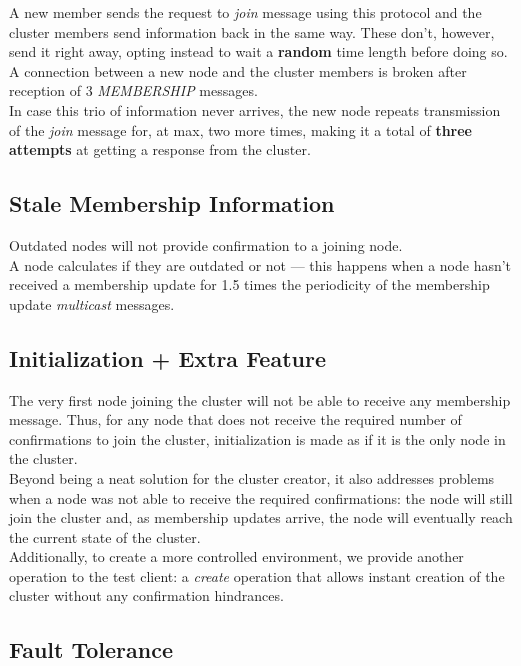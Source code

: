 \documentclass{article}
\begin{document}
\begin{multicols}{2}
	A new member sends the request to \textit{join} message using this protocol and the cluster members send information back in the same way. These don’t, however, send it right away, opting instead to wait a \textbf{random} time length before doing so.\\
	
	A connection between a new node and the cluster members is broken after reception of 3 \textit{MEMBERSHIP} messages.\\
	
	In case this trio of information never arrives, the new node repeats transmission of the \textit{join} message for, at max, two more times, making it a total of \textbf{three attempts} at getting a response from the cluster.
	
	\subsection{Stale Membership Information}
	Outdated nodes will not provide confirmation to a joining node.\\
	
	A node calculates if they are outdated or not --- this happens when a node hasn't received a membership update for 1.5 times the periodicity of the membership update \textit{multicast} messages.

    \subsection{Initialization + Extra Feature}
    The very first node joining the cluster will not be able to receive any membership message. Thus, for any node that does not receive the required number of confirmations to join the cluster, initialization is made as if it is the only node in the cluster. \\
    
    Beyond being a neat solution for the cluster creator, it also addresses problems when a node was not able to receive the required confirmations: the node will still join the cluster and, as membership updates arrive, the node will eventually reach the current state of the cluster. \\
    
    Additionally, to create a more controlled environment, we provide another operation to the test client: a \textit{create} operation that allows instant creation of the cluster without any confirmation hindrances. \\
    \subsection{Fault Tolerance}

\end{multicols}
\end{document}
